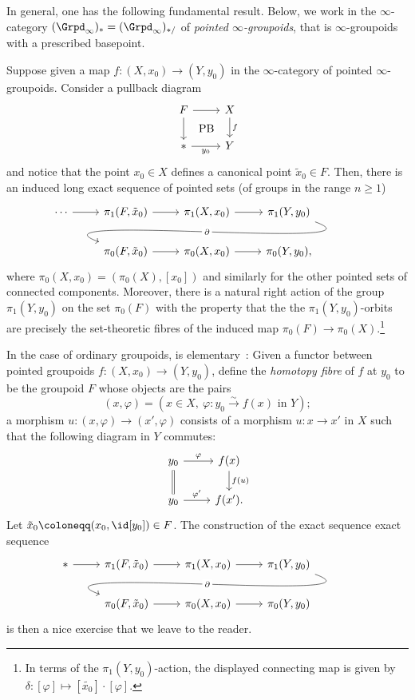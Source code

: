 \documentclass[a4paper]{amsart}
\begin{document}
In general, one has the following fundamental result. Below, we work in the
$\infty$-category $(\Grpd_\infty)_*=(\Grpd_{\infty})_{*/}$ of \emph{pointed
  $\infty$-groupoids}, that is $\infty$-groupoids with a prescribed basepoint.

\begin{theorem}
  \label{thm:Serre-les}
  Suppose given a map $f\colon (X,x_0)\to (Y,y_0)$ in the $\infty$-category of
  pointed $\infty$-groupoids. Consider a pullback diagram
  \[
    \begin{tikzcd}
      F\rar\dar\ar[phantom]{dr}[description]{\textup{PB}}&X\dar{f}\\
      *\rar[swap]{y_0}&Y
    \end{tikzcd}
  \]
  and notice that the point $x_0\in X$ defines a canonical point $\tilde{x}_0\in
  F$. Then, there is an induced long exact sequence of pointed sets (of groups
  in the range $n\geq1$)
  \[
    \begin{tikzcd}
      \cdots\rar&\pi_1(F,\tilde{x}_0)\rar&\pi_1(X,x_0)\rar&\pi_1(Y,y_0)\ar[out=-20,in=160]{dll}[description]{\partial}\\
      &\pi_0(F,\tilde{x}_0)\rar&\pi_0(X,x_0)\rar&\pi_0(Y,y_0),
    \end{tikzcd}
  \]
  where $\pi_0(X,x_0)=(\pi_0(X),[x_0])$ and similarly for the other pointed sets
  of connected components. Moreover, there is a natural right action of the
  group $\pi_1(Y,y_0)$ on the set $\pi_0(F)$ with the property that the the
  $\pi_1(Y,y_0)$-orbits are precisely the set-theoretic fibres of the induced
  map ${\pi_0(F)\to\pi_0(X)}$.\footnote{In terms of the $\pi_1(Y,y_0)$-action,
    the displayed connecting map is given by $\delta\colon [\varphi]\mapsto
    [\tilde{x_0}]\cdot[\varphi]$.}
\end{theorem}

\begin{example}
  In the case of ordinary groupoids,  is
  elementary~\cite[Section~V.2]{GZ67}: Given a functor between pointed
  groupoids ${f\colon(X,x_0)\to(Y,y_0)}$, define the \emph{homotopy fibre} of $f$
  at $y_0$ to be the groupoid $F$ whose objects are the pairs
  \[
    (x,\varphi)=(x\in X,\ \varphi\colon y_0\stackrel{\sim}{\to} f(x)\text{ in
    }Y);
  \]
  a morphism $u\colon (x,\varphi)\to(x',\varphi)$ consists of a morphism
  $u\colon x\to x'$ in $X$ such that the following diagram in $Y$ commutes:
  \[
    \begin{tikzcd}
      y_0\dar[equals]\rar{\varphi}&f(x)\dar{f(u)}\\
      y_0\rar{\varphi'}&f(x').
    \end{tikzcd}
  \]
  Let $\tilde{x}_0\coloneqq(x_0,\id[y_0])\in F$. The construction of the exact
  sequence exact sequence
  \[
    \begin{tikzcd}
      *\rar&\pi_1(F,\tilde{x}_0)\rar&\pi_1(X,x_0)\rar&\pi_1(Y,y_0)\ar[out=-20,in=160]{dll}[description]{\partial}\\
      &\pi_0(F,\tilde{x}_0)\rar&\pi_0(X,x_0)\rar&\pi_0(Y,y_0)
    \end{tikzcd}
  \]
  is then a nice exercise that we leave to the reader.
\end{example}
\end{document}
